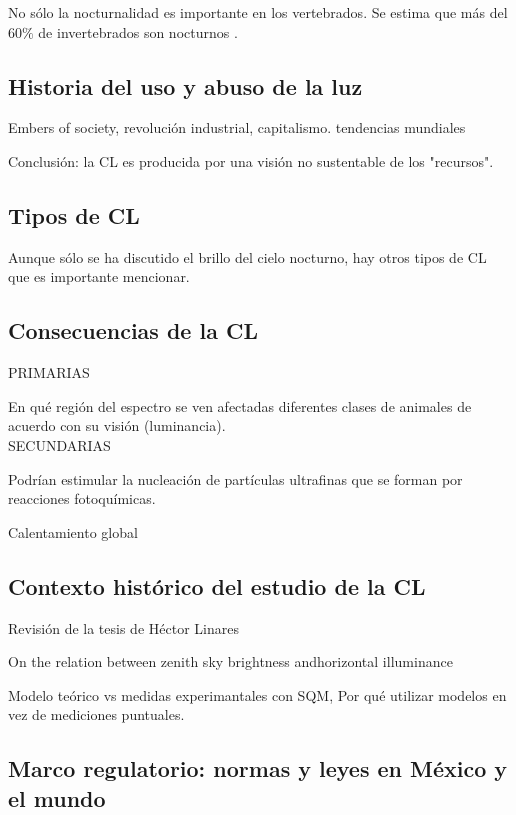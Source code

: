  No sólo la nocturnalidad es importante en los vertebrados. Se estima que más del 60$\%$ de invertebrados son nocturnos \citep{Longcore2006}.\\

\subsection{Historia del uso y abuso de la luz}

Embers of society, revolución industrial, capitalismo. tendencias mundiales 

Conclusión: la CL es producida por una visión no sustentable de los "recursos".

\subsection{Tipos de CL} 

Aunque sólo se ha discutido el brillo del cielo nocturno, hay otros tipos de CL que es importante mencionar. 

\subsection{Consecuencias de la CL}

PRIMARIAS

En qué región del espectro se ven afectadas diferentes clases de animales de acuerdo con su visión (luminancia).\\

SECUNDARIAS

Podrían estimular la nucleación de partículas ultrafinas que se forman por reacciones fotoquímicas.

Calentamiento global 

\subsection{Contexto histórico del estudio de la CL}

Revisión de la tesis de Héctor Linares

On the relation between zenith sky brightness andhorizontal illuminance

Modelo teórico vs medidas experimantales con SQM, Por qué utilizar modelos en vez de mediciones puntuales.

\subsection{Marco regulatorio: normas y leyes en México y el mundo}


